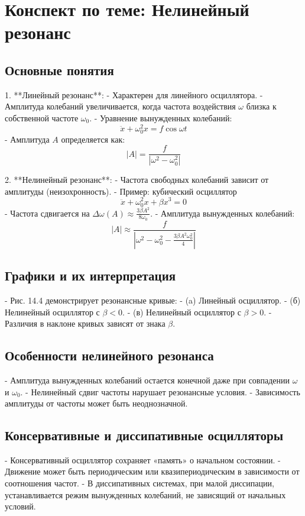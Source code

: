 \documentclass[10pt]{article}
\begin{document}
\section*{Конспект по теме: Нелинейный резонанс}

\subsection*{Основные понятия}

1. **Линейный резонанс**:
   - Характерен для линейного осциллятора.
   - Амплитуда колебаний увеличивается, когда частота воздействия $\omega$ близка к собственной частоте $\omega_0$.
   - Уравнение вынужденных колебаний: 
     \[
     \ddot{x} + \omega_0^2 x = f \cos \omega t
     \]
   - Амплитуда $A$ определяется как:
     \[
     |A| = \frac{f}{|\omega^2 - \omega_0^2|}
     \]

2. **Нелинейный резонанс**:
   - Частота свободных колебаний зависит от амплитуды (неизохронность).
   - Пример: кубический осциллятор
     \[
     \ddot{x} + \omega_0^2 x + \beta x^3 = 0
     \]
   - Частота сдвигается на $\Delta \omega(A) \approx \frac{3 \beta A^2}{8 \omega_0}$.
   - Амплитуда вынужденных колебаний:
     \[
     |A| \approx \frac{f}{|\omega^2 - \omega_0^2 - \frac{3 \beta A^2 \omega_0^2}{4}|}
     \]

\subsection*{Графики и их интерпретация}

- Рис. 14.4 демонстрирует резонансные кривые:
  - (a) Линейный осциллятор.
  - (б) Нелинейный осциллятор с $\beta < 0$.
  - (в) Нелинейный осциллятор с $\beta > 0$.
- Различия в наклоне кривых зависят от знака $\beta$.

\subsection*{Особенности нелинейного резонанса}

- Амплитуда вынужденных колебаний остается конечной даже при совпадении $\omega$ и $\omega_0$.
- Нелинейный сдвиг частоты нарушает резонансные условия.
- Зависимость амплитуды от частоты может быть неоднозначной.

\subsection*{Консервативные и диссипативные осцилляторы}

- Консервативный осциллятор сохраняет «память» о начальном состоянии.
- Движение может быть периодическим или квазипериодическим в зависимости от соотношения частот.
- В диссипативных системах, при малой диссипации, устанавливается режим вынужденных колебаний, не зависящий от начальных условий.
\end{document}
